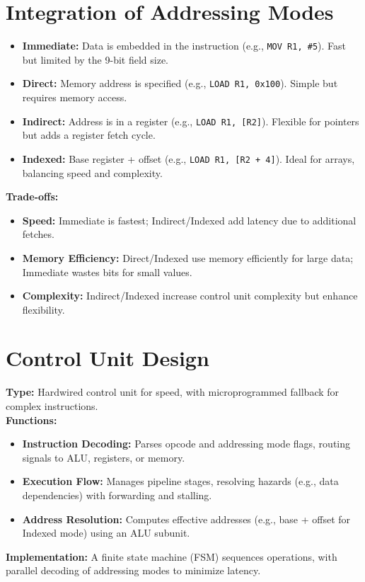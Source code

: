\documentclass[a4paper,12pt]{article}
\begin{document}
\section{Integration of Addressing Modes}
\begin{itemize}
    \item \textbf{Immediate:} Data is embedded in the instruction (e.g., \texttt{MOV R1, \#5}). Fast but limited by the 9-bit field size.
    \item \textbf{Direct:} Memory address is specified (e.g., \texttt{LOAD R1, 0x100}). Simple but requires memory access.
    \item \textbf{Indirect:} Address is in a register (e.g., \texttt{LOAD R1, [R2]}). Flexible for pointers but adds a register fetch cycle.
    \item \textbf{Indexed:} Base register + offset (e.g., \texttt{LOAD R1, [R2 + 4]}). Ideal for arrays, balancing speed and complexity.
\end{itemize}
\textbf{Trade-offs:}
\begin{itemize}
    \item \textbf{Speed:} Immediate is fastest; Indirect/Indexed add latency due to additional fetches.
    \item \textbf{Memory Efficiency:} Direct/Indexed use memory efficiently for large data; Immediate wastes bits for small values.
    \item \textbf{Complexity:} Indirect/Indexed increase control unit complexity but enhance flexibility.
\end{itemize}

\section{Control Unit Design}
\textbf{Type:} Hardwired control unit for speed, with microprogrammed fallback for complex instructions. \\
\textbf{Functions:}
\begin{itemize}
    \item \textbf{Instruction Decoding:} Parses opcode and addressing mode flags, routing signals to ALU, registers, or memory.
    \item \textbf{Execution Flow:} Manages pipeline stages, resolving hazards (e.g., data dependencies) with forwarding and stalling.
    \item \textbf{Address Resolution:} Computes effective addresses (e.g., base + offset for Indexed mode) using an ALU subunit.
\end{itemize}
\textbf{Implementation:} A finite state machine (FSM) sequences operations, with parallel decoding of addressing modes to minimize latency.
\end{document}

